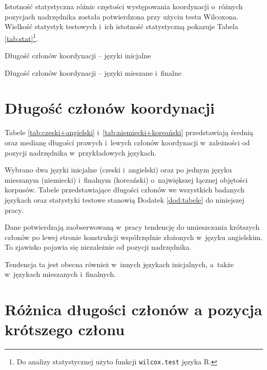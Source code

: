 Istotność statystyczna różnic częstości występowania koordynacji o~różnych pozycjach nadrzędnika została  potwierdzona przy użyciu testu Wilcoxona. Wielkość statystyk testowych i~ich istotność statystyczną pokazuje Tabela \ref{tab:stat}\footnote{
Do analizy statystycznej użyto funkcji \texttt{wilcox.test} języka R.}.



\begin{table}[H]
\centering
\resizebox{\linewidth}{!}{

\quad

}
\caption{Długość członów koordynacji -- języki inicjalne}
\label{tab:czeski+angielski}
\end{table}

\begin{table}[H]
\centering
\resizebox{\linewidth}{!}{

\quad

}
\caption{Długość członów koordynacji -- języki mieszane i~finalne}
\label{tab:niemiecki+koreański}
\end{table}

\section{Długość członów koordynacji}

Tabele \ref{tab:czeski+angielski} i~\ref{tab:niemiecki+koreański} przedstawiają średnią oraz medianę długości prawych i~lewych członów koordynacji w~zależności od pozycji nadrzędnika w~przykładowych językach. 

Wybrano dwa języki inicjalne (czeski i~angielski) oraz po jednym języku mieszanym (niemiecki) i~finalnym (koreański) o~największej łącznej objętości korpusów. Tabele przedstawiające długości członów we wszystkich badanych językach oraz statystyki testowe stanowią Dodatek \ref{dod:tabele} do niniejszej pracy.

Dane potwierdzają zaobserwowaną w~pracy \cite{przepiorkowski2023conjunct} tendencję do umieszczania krótszych członów po lewej stronie konstrukcji współrzędnie złożonych w~języku angielskim. To zjawisko pojawia się niezależnie od pozycji nadrzędnika.

Tendencja ta jest obecna również w~innych językach inicjalnych, a~także w~językach mieszanych i~finalnych.

\section{Różnica długości członów a pozycja krótszego członu}

